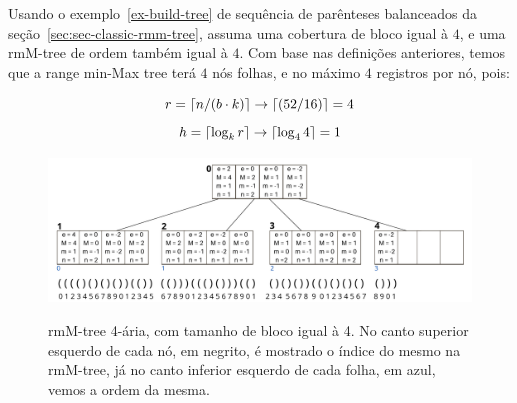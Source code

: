 \begin{example}
    Usando o exemplo~\ref{ex-build-tree} de sequência de parênteses balanceados da seção~\ref{sec:sec-classic-rmm-tree}, assuma uma cobertura de bloco igual à $4$, e uma rmM-tree de  ordem também igual à $4$.  Com base nas definições anteriores, temos que a range min-Max tree terá $4$ nós folhas, e no máximo $4$ registros por nó, pois:

    $$r = \lceil n/(b \cdot k)\rceil \to \lceil(52/16)\rceil = 4$$
    $$h = \lceil\log_k r\rceil \to \lceil\log_4 4\rceil = 1 $$
        \begin{figure}[h!]
        \centering
          \caption[rmM-tree 4-ária.]{rmM-tree 4-ária, com tamanho de bloco igual à 4. No canto superior esquerdo de cada nó, em negrito,
            é mostrado o índice do mesmo na rmM-tree, já no canto inferior esquerdo de cada folha, em azul, vemos a ordem da mesma.}
          \includegraphics[width=\columnwidth]{images/rmm-tree-kary.png}
          \label{fig:rmm-tree-k}
        \end{figure}
        

\end{example}
